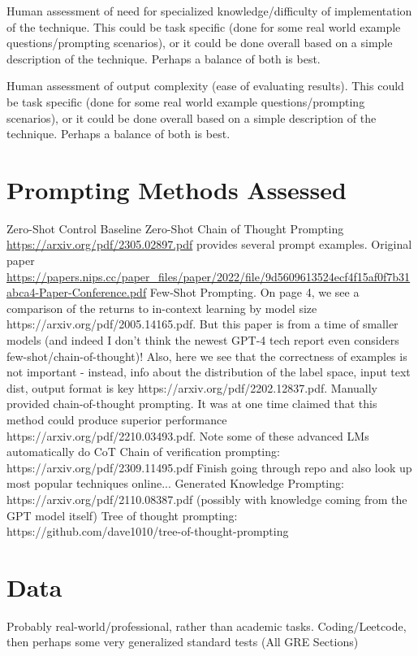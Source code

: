 \documentclass[11pt]{article}
\begin{document}
Human assessment of need for specialized knowledge/difficulty of implementation of the technique. This could be task specific (done for some real world example questions/prompting scenarios), or it could be done overall based on a simple description of the technique. Perhaps a balance of both is best.

Human assessment of output complexity (ease of evaluating results). This could be task specific (done for some real world example questions/prompting scenarios), or it could be done overall based on a simple description of the technique. Perhaps a balance of both is best.

\section{Prompting Methods Assessed}

Zero-Shot Control Baseline
Zero-Shot Chain of Thought Prompting \url{https://arxiv.org/pdf/2305.02897.pdf} provides several prompt examples. Original paper \url{https://papers.nips.cc/paper_files/paper/2022/file/9d5609613524ecf4f15af0f7b31abca4-Paper-Conference.pdf}
Few-Shot Prompting. On page 4, we see a comparison of the returns to in-context learning by model size https://arxiv.org/pdf/2005.14165.pdf. But this paper is from a time of smaller models (and indeed I don't think the newest GPT-4 tech report even considers few-shot/chain-of-thought)! Also, here we see that the correctness of examples is not important - instead, info about the distribution of the label space, input text dist, output format is key https://arxiv.org/pdf/2202.12837.pdf.
Manually provided chain-of-thought prompting. It was at one time claimed that this method could produce superior performance https://arxiv.org/pdf/2210.03493.pdf. Note some of these advanced LMs automatically do CoT
Chain of verification prompting: https://arxiv.org/pdf/2309.11495.pdf
Finish going through repo and also look up most popular techniques online...
Generated Knowledge Prompting: https://arxiv.org/pdf/2110.08387.pdf (possibly with knowledge coming from the GPT model itself)
Tree of thought prompting: https://github.com/dave1010/tree-of-thought-prompting

\section{Data}

Probably real-world/professional, rather than academic tasks. Coding/Leetcode, then perhaps some very generalized standard tests (All GRE Sections)
\end{document}
